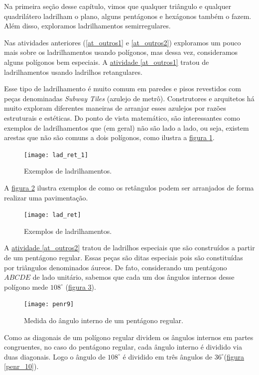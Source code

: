

Na primeira seção desse capítulo, vimos que qualquer triângulo e qualquer quadrilátero ladrilham o plano, alguns pentágonos e hexágonos também o fazem. Além disso, exploramos ladrilhamentos semirregulares. 

Nas atividades anteriores (\ref{at_outros1} e \ref{at_outros2}) exploramos um pouco mais sobre os ladrilhamentos usando polígonos, mas dessa vez, consideramos alguns polígonos bem especiais. A \hyperref[at_outros1]{atividade \ref{at_outros1}} tratou de ladrilhamentos usando ladrilhos retangulares.

Esse tipo de ladrilhamento é muito comum em  paredes e pisos revestidos com peças denominadas \textit{Subway Tiles }(azulejo de metrô). Construtores e arquitetos  há muito exploram diferentes maneiras de arranjar esses azulejos por razões estruturais e estéticas. Do ponto de vista  matemático, são interessantes como exemplos de ladrilhamentos que (em geral) não são  lado a lado, ou seja, existem arestas que não são comuns a dois polígonos, como ilustra a \hyperref[lad_ret1]{figura \ref{lad_ret1}}.

\begin{figure}[H]
	\centering
	\texttt{[image: lad\_ret\_1]}
	\caption{Exemplos de ladrilhamentos.}
	\label{lad_ret1}
	\end{figure}


A \hyperref[lad_ret]{figura \ref{lad_ret}} ilustra exemplos de como os retângulos podem ser arranjados de forma realizar uma pavimentação.
 \begin{figure}[H]
	\centering
	\texttt{[image: lad\_ret]}
	\caption{Exemplos de ladrilhamentos.}
	\label{lad_ret}
	\end{figure}


A \hyperref[at_outros2]{atividade \ref{at_outros2}} tratou de ladrilhos especiais que são construídos a partir de um pentágono regular. Essas peças são ditas especiais pois são constituídas por triângulos denominados áureos. De fato, considerando  um pentágono $ABCDE$ de lado unitário, sabemos que cada um dos ângulos internos desse polígono mede $108^{\circ}$ (\hyperref[penr_9]{figura \ref{penr_9}}). 

\begin{figure}[H]
	\centering
	\texttt{[image: penr9]}
	\caption{Medida do ângulo interno de um pentágono regular.}
	\label{penr_9}
	\end{figure}


Como as diagonais de um polígono regular dividem os ângulos internos em partes congruentes, no caso do pentágono regular, cada ângulo interno é dividido via duas diagonais. Logo o ângulo de  $108^{\circ}$ é dividido em três ângulos de $36^{\circ}$(\hyperref[penr_10]{figura \ref{penr_10}}). 


